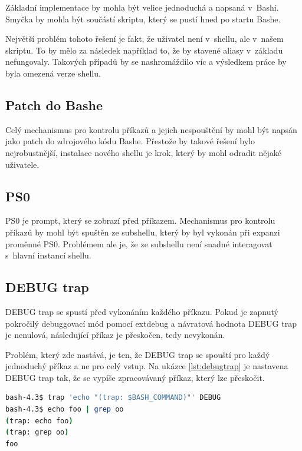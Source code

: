 \documentclass[thesis=M,czech]{FITthesis}[2012/06/26]
\begin{document}
Základní implementace by mohla být velice jednoduchá a napsaná v~Bashi. Smyčka by mohla být součástí skriptu, který se pustí hned po startu Bashe.

Největší problém tohoto řešení je fakt, že uživatel není v~shellu, ale v~našem skriptu. To by mělo za následek například to, že by stavené aliasy v~základu nefungovaly. Takových případů by se nashromáždilo víc a výsledkem práce by byla omezená verze shellu.


%
%
\subsection{Patch do Bashe}

Celý mechanismus pro kontrolu příkazů a jejich nespouštění by mohl být napsán jako patch do zdrojového kódu Bashe. Přestože by takové řešení bylo nejrobustnější, instalace nového shellu je krok, který by mohl odradit nějaké uživatele.

%
\subsection{PS0}

PS0 je prompt, který se zobrazí před  příkazem. Mechanismus pro kontrolu příkazů by mohl být spuštěn ze subshellu, který by byl vykonán při expanzi proměnné PS0. Problémem ale je, že ze subshellu není snadné interagovat s~hlavní instancí shellu.

%
%
\subsection{DEBUG trap}

DEBUG trap se spustí před vykonáním každého příkazu. Pokud je zapnutý pokročilý debuggovací mód pomocí extdebug a návratová hodnota DEBUG trap je nenulová, následující příkaz je přeskočen, tedy nevykonán.

Problém, který zde nastává, je ten, že DEBUG trap se spouští pro každý jednoduchý příkaz a ne pro celý vstup. Na ukázce \ref{lst:debugtrap} je nastavena DEBUG trap tak, že se vypíše zpracovávaný příkaz, který lze přeskočit.

\noindent
\begin{minipage}{\linewidth}
\begin{lstlisting}[language=bash, caption={DEBUG trap}, label={lst:debugtrap}]
bash-4.3$ trap 'echo "(trap: $BASH_COMMAND)"' DEBUG
bash-4.3$ echo foo | grep oo
(trap: echo foo)
(trap: grep oo)
foo
\end{lstlisting}
\end{minipage}
\end{document}
